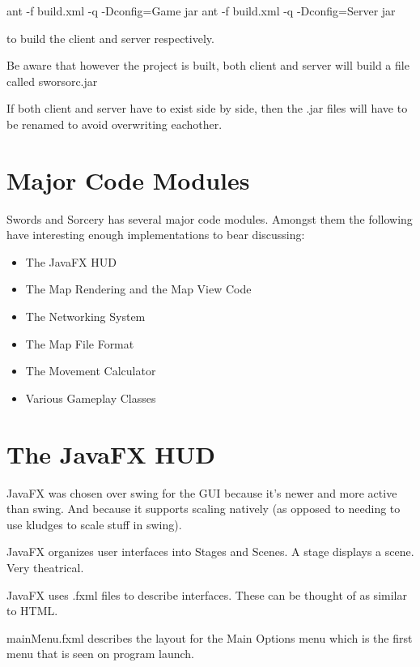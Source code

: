 \documentclass[12pt,a4paper]{article}
\begin{document}
    ant -f build.xml -q -Dconfig=Game jar
    ant -f build.xml -q -Dconfig=Server jar

to build the client and server respectively.

Be aware that however the project is built, 
both client and server will build a file called sworsorc.jar

If both client and server have to exist side by side,
then the .jar files will have to be renamed to avoid overwriting eachother.

\section{Major Code Modules}
Swords and Sorcery has several major code modules. Amongst them the following
have interesting enough implementations to bear discussing:

\begin{itemize}
	\item The JavaFX HUD	
	\item The Map Rendering and the Map View Code
	\item The Networking System
	\item The Map File Format
	\item The Movement Calculator
    \item Various Gameplay Classes
\end{itemize}

\section{The JavaFX HUD}
JavaFX was chosen over swing for the GUI because it's newer and more active
than swing. And because it supports scaling natively (as opposed to needing to
use kludges to scale stuff in swing).

JavaFX organizes user interfaces into Stages and Scenes. A stage displays a 
scene. Very theatrical.

JavaFX uses .fxml files to describe interfaces. These can be thought of as
similar to HTML.

mainMenu.fxml describes the layout for the Main Options menu which is the first
menu that is seen on program launch.
\end{document}
